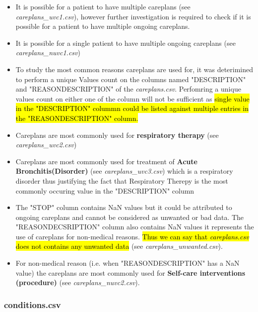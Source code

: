 \documentclass[12pt, twosided]{report}  %
\begin{document}
\begin{itemize}
	\item It is possible for a patient to  have multiple careplans (see \textit{careplans\_uvc1.csv}), however further investigation is required to check if it is possible for a patient to have multiple ongoing careplans.
	
	\item It is possible for a single patient to have multiple ongoing careplans (see \textit{careplans\_nuvc1.csv})
	
	\item To study the most common reasons careplans are used for, it was deterimined to perform a unique Values count on the columns named "DESCRIPTION" and "REASONDESCRIPTION" of the \textit{careplans.csv}. Perfomring a unique values count on either one of the column will not be sufficient as \hl{single value in the "DESCRIPTION" colummn could be listed  against multiple entries in the "REASONDESCRIPTION" column.}
	
	\item Careplans are most commonly used for \textbf{respiratory therapy} (see \textit{careplans\_uvc2.csv})
	
	\item Careplans are most commonly used for treatment of \textbf{Acute Bronchitis(Disorder)} (see \textit{careplans\_uvc3.csv}) which is a respiratory disorder thus justifying the fact that Respiratory Therepy is the most commonly occuring value in the "DESCRIPTION" column
	
	\item The "STOP" column contains NaN values but it could be attributed to ongoing careplans and cannot be considered as unwanted or bad data. The "REASONDECSRIPTION" column also contains NaN values it represents the use of careplans for non-medical reasons. \hl{Thus we can say that \textit{careplans.csv} does not contains any unwanted data} (see \textit{careplans\_unwanted.csv}).
	
	\item For non-medical reason (i.e. when "REASONDESCRIPTION" has a NaN value) the careplans are most commonly used for \textbf{Self-care interventions (procedure)} (see \textit{careplans\_nuvc2.csv}).
	
\end{itemize}

\subsubsection{conditions.csv}
\end{document}
